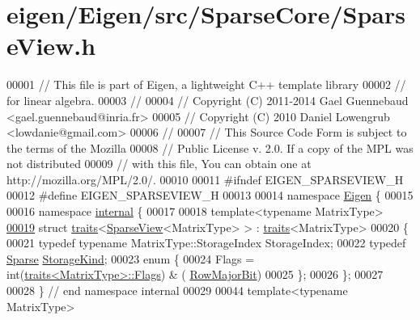 \hypertarget{eigen_2_eigen_2src_2_sparse_core_2_sparse_view_8h_source}{}\section{eigen/\+Eigen/src/\+Sparse\+Core/\+Sparse\+View.h}
\label{eigen_2_eigen_2src_2_sparse_core_2_sparse_view_8h_source}

\begin{DoxyCode}
00001 \textcolor{comment}{// This file is part of Eigen, a lightweight C++ template library}
00002 \textcolor{comment}{// for linear algebra.}
00003 \textcolor{comment}{//}
00004 \textcolor{comment}{// Copyright (C) 2011-2014 Gael Guennebaud <gael.guennebaud@inria.fr>}
00005 \textcolor{comment}{// Copyright (C) 2010 Daniel Lowengrub <lowdanie@gmail.com>}
00006 \textcolor{comment}{//}
00007 \textcolor{comment}{// This Source Code Form is subject to the terms of the Mozilla}
00008 \textcolor{comment}{// Public License v. 2.0. If a copy of the MPL was not distributed}
00009 \textcolor{comment}{// with this file, You can obtain one at http://mozilla.org/MPL/2.0/.}
00010 
00011 \textcolor{preprocessor}{#ifndef EIGEN\_SPARSEVIEW\_H}
00012 \textcolor{preprocessor}{#define EIGEN\_SPARSEVIEW\_H}
00013 
00014 \textcolor{keyword}{namespace }\hyperlink{namespace_eigen}{Eigen} \{ 
00015 
00016 \textcolor{keyword}{namespace }\hyperlink{namespaceinternal}{internal} \{
00017 
00018 \textcolor{keyword}{template}<\textcolor{keyword}{typename} MatrixType>
\hyperlink{struct_eigen_1_1internal_1_1traits_3_01_sparse_view_3_01_matrix_type_01_4_01_4}{00019} \textcolor{keyword}{struct }\hyperlink{struct_eigen_1_1internal_1_1traits}{traits}<\hyperlink{group___sparse_core___module_class_eigen_1_1_sparse_view}{SparseView}<MatrixType> > : \hyperlink{struct_eigen_1_1internal_1_1traits}{traits}<MatrixType>
00020 \{
00021   \textcolor{keyword}{typedef} \textcolor{keyword}{typename} MatrixType::StorageIndex StorageIndex;
00022   \textcolor{keyword}{typedef} \hyperlink{struct_eigen_1_1_sparse}{Sparse} \hyperlink{struct_eigen_1_1_sparse}{StorageKind};
00023   \textcolor{keyword}{enum} \{
00024     Flags = int(\hyperlink{struct_eigen_1_1internal_1_1traits}{traits<MatrixType>::Flags}) & (
      \hyperlink{group__flags_gae4f56c2a60bbe4bd2e44c5b19cbe8762}{RowMajorBit})
00025   \};
00026 \};
00027 
00028 \} \textcolor{comment}{// end namespace internal}
00029 
00044 \textcolor{keyword}{template}<\textcolor{keyword}{typename} MatrixType>

\end{DoxyCode}
